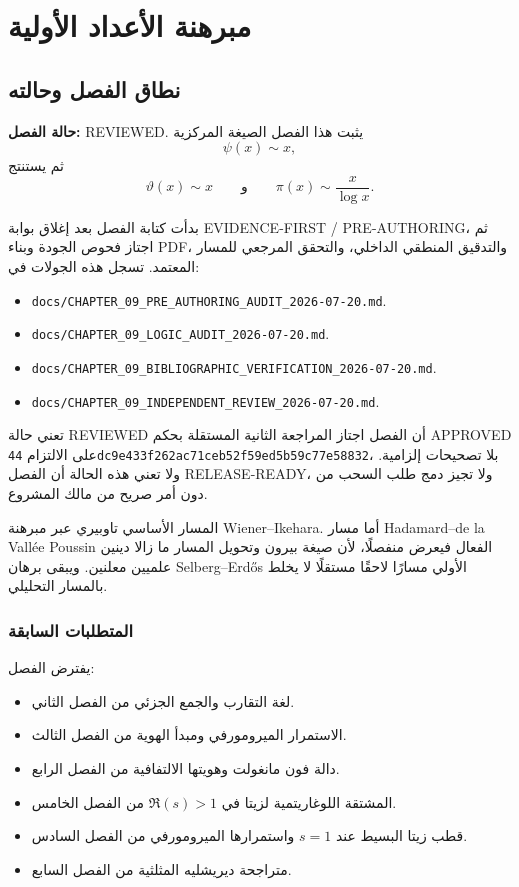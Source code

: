 \chapter{مبرهنة الأعداد الأولية}

\section{نطاق الفصل وحالته}

\noindent\textbf{حالة الفصل:} \textenglish{REVIEWED}. يثبت هذا الفصل الصيغة
المركزية
\[
\psi(x)\sim x,
\]
ثم يستنتج
\[
\vartheta(x)\sim x
\qquad\text{و}\qquad
\pi(x)\sim\frac{x}{\log x}.
\]

بدأت كتابة الفصل بعد إغلاق بوابة
\textenglish{EVIDENCE-FIRST / PRE-AUTHORING}، ثم اجتاز فحوص الجودة وبناء
PDF، والتدقيق المنطقي الداخلي، والتحقق المرجعي للمسار المعتمد. تسجل هذه
الجولات في:
\begin{itemize}
  \item \texttt{docs/CHAPTER\_09\_PRE\_AUTHORING\_AUDIT\_2026-07-20.md}.
  \item \texttt{docs/CHAPTER\_09\_LOGIC\_AUDIT\_2026-07-20.md}.
  \item \texttt{docs/CHAPTER\_09\_BIBLIOGRAPHIC\_VERIFICATION\_2026-07-20.md}.
  \item \texttt{docs/CHAPTER\_09\_INDEPENDENT\_REVIEW\_2026-07-20.md}.
\end{itemize}
تعني حالة \textenglish{REVIEWED} أن الفصل اجتاز المراجعة الثانية
المستقلة بحكم \textenglish{APPROVED} على الالتزام
\texttt{44dc9e433f262ac71ceb52f59ed5b59c77e58832}، بلا تصحيحات إلزامية.
ولا تعني هذه الحالة أن الفصل \textenglish{RELEASE-READY}، ولا تجيز دمج
طلب السحب من دون أمر صريح من مالك المشروع.

المسار الأساسي تاوبيري عبر مبرهنة Wiener--Ikehara. أما مسار
Hadamard--de la Vallée Poussin الفعال فيعرض منفصلًا، لأن صيغة بيرون وتحويل
المسار ما زالا دينين علميين معلنين. ويبقى برهان Selberg--Erdős الأولي
مسارًا لاحقًا مستقلًا لا يخلط بالمسار التحليلي.

\subsection{المتطلبات السابقة}

يفترض الفصل:
\begin{itemize}
  \item لغة التقارب والجمع الجزئي من الفصل الثاني.
  \item الاستمرار الميرومورفي ومبدأ الهوية من الفصل الثالث.
  \item دالة فون مانغولت وهويتها الالتفافية من الفصل الرابع.
  \item المشتقة اللوغاريتمية لزيتا في \(\Re(s)>1\) من الفصل الخامس.
  \item قطب زيتا البسيط عند \(s=1\) واستمرارها الميرومورفي من الفصل السادس.
  \item متراجحة ديريشليه المثلثية من الفصل السابع.
\end{itemize}

